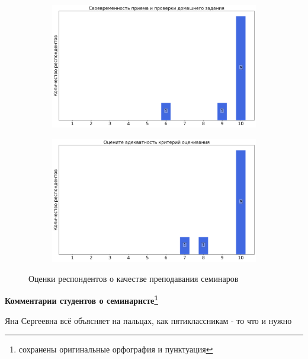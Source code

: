 \begin{figure}[H]
\begin{subfigure}[b]{0.45\textwidth}
                \includegraphics[width=\textwidth]{images/1 course/Аналитическая геометрия/seminarists-marks-Агаханова Я.С.-2.png}
            \end{subfigure}
            \begin{subfigure}[b]{0.45\textwidth}
                \centering
                \includegraphics[width=\textwidth]{images/1 course/Аналитическая геометрия/seminarists-marks-Агаханова Я.С.-3.png}
            \end{subfigure}	
            \caption{Оценки респондентов о качестве преподавания семинаров}
        \end{figure}
    
        \textbf{Комментарии студентов о семинаристе\protect\footnote{сохранены оригинальные орфография и пунктуация}}
            \begin{commentbox} 
                Яна Сергеевна всё объясняет на пальцах, как пятиклассникам - то что и нужно 
            \end{commentbox}
            

